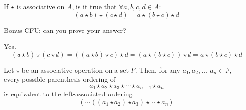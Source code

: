 \begin{problem*}[CFU]
    If $\star$ is associative on $A$, is it true that $\forall a,b,c,d \in A$:
    \[
        (a \star b) \star (c \star d) = a \star (b \star c) \star d
    \]
    
    Bonus CFU: can you prove your answer?
\end{problem*}

\begin{answer}
    Yes.
    \[
        (a \star b) \star (c \star d) = ((a \star b) \star c) \star d = (a \star (b \star c)) \star d = a \star (b \star c) \star d
    \]
\end{answer}

\begin{theorem}\label{thm:generalized-associativity}
    Let $\star$ be an associative operation on a set $F$. Then, for any $a_1, a_2, \ldots, a_n \in F$, every possible parenthesis ordering of
    \[
        a_1 \star a_2 \star a_3 \star \cdots \star a_{n-1} \star a_n
    \]
    is equivalent to the left-associated ordering:
    \[
        (\cdots((a_1 \star a_2) \star a_3) \star \cdots \star a_n)
    \]
\end{theorem}

